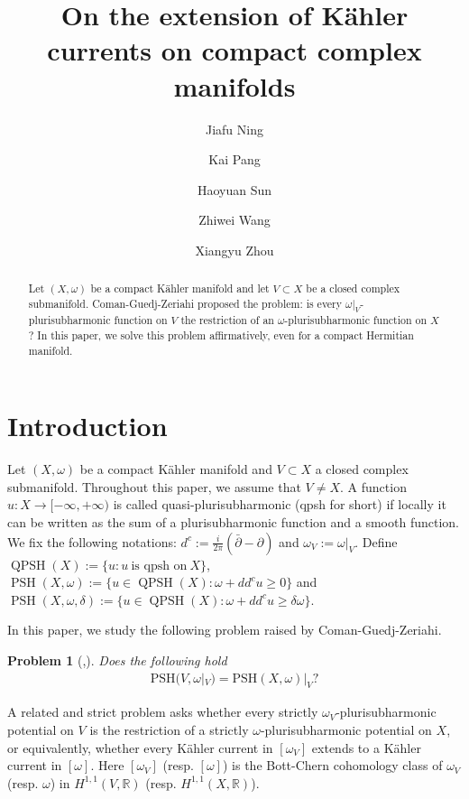 \documentclass[12pt,reqno]{amsart}
\title[Extension of K\"ahler currents]{On the extension of K\"ahler currents on compact complex manifolds}
\author[J. Ning]{{Jiafu Ning}}
\author[K. Pang]{Kai Pang}
\author[H. Sun]{Haoyuan Sun}
\author[Z. Wang]{Zhiwei Wang}
\author[X. Zhou]{Xiangyu Zhou}
\newtheorem{prob}{Problem}[section]
\newcommand{\PSH}{\operatorname{PSH}}
\newcommand{\QPSH}{\operatorname{QPSH}}
\newcommand{\ddc}{dd^c}
\begin{document}
	
	\begin{abstract}
Let $(X,\omega)$ be a compact K\"ahler manifold and let $V\subset X$ be a closed complex submanifold. Coman-Guedj-Zeriahi proposed the problem: is every $\omega|_V$-plurisubharmonic function on $V$ the restriction of an $\omega$-plurisubharmonic function on $X$? In this paper, we solve this problem affirmatively, even for a compact Hermitian manifold.
		
	\end{abstract}
	
	\maketitle
	\tableofcontents
	\section{Introduction}
	
	Let $(X,\omega)$ be a compact K\"ahler manifold and $V\subset X$ a closed complex submanifold. Throughout this paper, we assume that $V\neq X$.  A function $u\colon X\to[-\infty,+\infty)$ is called quasi-plurisubharmonic (qpsh for short) if locally it can be written as the sum of a plurisubharmonic function and a smooth function. We fix the following notations: $d^c:=\frac{i}{2\pi}(\bar\partial-\partial)$ and $\omega_V:=\omega|_V$.
Define $\QPSH(X):=\{u: u\ \text{is qpsh on}\  X\}$, 
$\PSH(X,\omega) :=\{u\in\QPSH(X):\omega+\ddc u\geq0\}$ and $\PSH(X,\omega,\delta) :=\{u\in\QPSH(X):\omega+\ddc u\geq\delta\omega\}$.
	
	
	
	In this paper, we study  the following  problem raised by Coman-Guedj-Zeriahi.
	\begin{prob}[{\cite[p. 40]{CGZ13},\cite[Problem 37]{DGZ}}]\label{prob:1}
		Does the following hold
		\begin{align*}
			\mbox{PSH}(V,\omega|_V)=\mbox{PSH}(X,\omega)|_V?
		\end{align*}
	\end{prob}
	
	A related and strict problem asks whether every strictly $\omega_V$-plurisubharmonic potential on $V$ is the restriction of a strictly $\omega$-plurisubharmonic potential on $X$, or equivalently,  whether every K\"ahler current in $[\omega_V]$ extends to a K\"ahler current in $[\omega]$. Here  $[\omega_V]$ (resp. $[\omega]$) is the Bott-Chern cohomology class of $\omega_V$ (resp. $\omega$) in $H^{1,1}(V,\mathbb R)$ (resp.  $H^{1,1}(X,\mathbb R)$).
	
\end{document}
